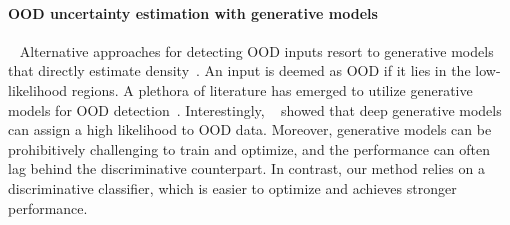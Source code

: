 \documentclass{article}
\begin{document}
\vspace{-0.2cm}
\paragraph{OOD uncertainty estimation with generative models} ~ Alternative approaches for detecting OOD inputs resort to generative models that directly estimate density~\cite{dinh2017density,huang2017stacked, kingma2014autoencoding, oord2016conditional, rezende2014stochastic,  tabak2013family}. An input is deemed as OOD if it lies in the low-likelihood regions. A plethora of literature has emerged to utilize generative models for OOD detection~\cite{ kirichenko2020normalizing, ren2019likelihood, schirrmeister2020understanding, serra2019input, wang2020further, winkens2020contrastive, xiao2020likelihood}.
Interestingly, \citeauthor{nalisnick2018deep}~\cite{nalisnick2018deep} showed that deep generative models can assign a high likelihood to OOD data.
Moreover, generative models can be prohibitively challenging to train and optimize, and the performance can often lag behind the discriminative counterpart. In contrast, our method relies on a discriminative classifier, which is easier to optimize and achieves stronger performance. %


\end{document}
